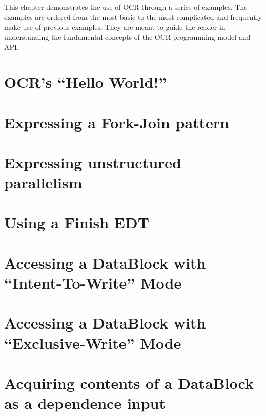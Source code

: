 This chapter demonstrates the use of OCR through a series of
examples. The examples are ordered from the most basic to the most
complicated and frequently make use of previous examples. They are
meant to guide the reader in understanding the fundamental concepts of
the OCR programming model and API.


\section{OCR's ``Hello World!''}

\section{Expressing a Fork-Join pattern}

\section{Expressing unstructured parallelism}

\section{Using a Finish EDT}

\section{Accessing a DataBlock with ``Intent-To-Write'' Mode}

\section{Accessing a DataBlock with ``Exclusive-Write'' Mode}

\section{Acquiring contents of a DataBlock as a dependence input}

